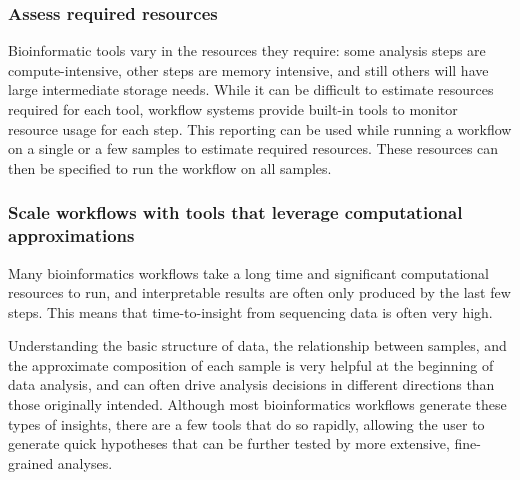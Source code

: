 \documentclass[10pt,letterpaper]{article}
\begin{document}
\subsubsection*{Assess required resources}

Bioinformatic tools vary in the resources they require: some analysis steps are compute-intensive, other steps are memory intensive, and still others will have large intermediate storage needs. 
While it can be difficult to estimate resources required for each tool, workflow systems provide built-in tools to monitor resource usage for each step. 
This reporting can be used while running a workflow on a single or a few samples to estimate required resources. 
These resources can then be specified to run the workflow on all samples.
 
\subsubsection*{Scale workflows with tools that leverage computational approximations}
 
 Many bioinformatics workflows take a long time and significant computational resources to run, and interpretable results are often only produced by the last few steps. 
This means that time-to-insight from sequencing data is often very high. 
 
Understanding the basic structure of data, the relationship between samples, and the approximate composition of each sample is very helpful at the beginning of data analysis, and can often drive analysis decisions in different directions than those originally intended. 
Although most bioinformatics workflows generate these types of insights, there are a few tools that do so rapidly, allowing the user to generate quick hypotheses that can be further tested by more extensive, fine-grained analyses. 
\end{document}
